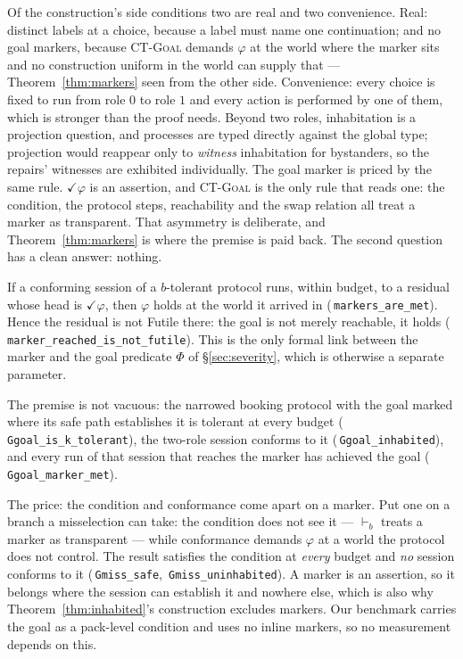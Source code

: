 \documentclass[a4paper,UKenglish,cleveref,autoref,thm-restate,anonymous]{lipics-v2021}
\newcommand{\Fut}{\textsf{Futile}}
\newcommand{\coqok}[1]{\textcolor{okgreen}{\ding{51}}\,\texttt{\small #1}}
\begin{document}
Of the construction's side conditions two are real and two convenience. Real: distinct labels at a choice,
because a label must name one continuation; and no goal markers, because
\textsc{CT-Goal} demands $\varphi$ at the world where the marker sits and no
construction uniform in the world can supply that --- Theorem~\ref{thm:markers}
seen from the other side. Convenience: every choice is fixed to run from role
$0$ to role $1$ and every action is performed by one of them, which is
stronger than the proof needs. Beyond two roles, inhabitation is a projection
question, and processes are typed directly against the global type; projection
would reappear only to \emph{witness} inhabitation for bystanders, so the
repairs' witnesses are exhibited individually. The goal marker is priced by the same
rule. $\checkmark\varphi$ is an assertion, and \textsc{CT-Goal} is the only
rule that reads one: the condition, the protocol steps, reachability and the
swap relation all treat a marker as transparent. That asymmetry is deliberate,
and Theorem~\ref{thm:markers} is where the premise is paid back.
The second question has a clean answer: nothing.

\begin{theorem}\label{thm:markers}
If a conforming session of a $b$-tolerant protocol runs, within budget, to a
residual whose head is $\checkmark\varphi$, then $\varphi$ holds at the world
it arrived in (\coqok{markers\_are\_met}). Hence the residual is not \Fut{}
there: the goal is not merely reachable, it holds
(\coqok{marker\_reached\_is\_not\_futile}). This is the only formal link
between the marker and the goal predicate $\Phi$ of \S\ref{sec:severity},
which is otherwise a separate parameter.
\end{theorem}

The premise is not vacuous: the narrowed booking protocol with the goal marked
where its safe path establishes it is tolerant at every budget
(\coqok{Ggoal\_is\_k\_tolerant}), the two-role session conforms to it
(\coqok{Ggoal\_inhabited}), and every run of that session that reaches the
marker has achieved the goal (\coqok{Ggoal\_marker\_met}).

The price: the condition and conformance come apart on a marker. Put one on a branch a misselection can
take: the condition does not see it --- $\vdash_b$ treats a marker as
transparent --- while conformance demands $\varphi$ at a world the protocol does
not control. The result satisfies the condition at \emph{every} budget and
\emph{no} session conforms to it (\coqok{Gmiss\_safe},
\coqok{Gmiss\_uninhabited}). A marker is an assertion, so it belongs where the
session can establish it and nowhere else, which is also why
Theorem~\ref{thm:inhabited}'s construction excludes markers. Our benchmark
carries the goal as a pack-level condition and uses no inline markers, so no
measurement depends on this.
\end{document}
